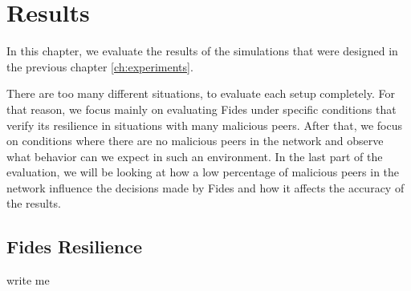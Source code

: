 \chapter{Results}
\label{ch:results}

In this chapter, we evaluate the results of the simulations that were designed in the previous chapter \ref{ch:experiments}.

There are too many different situations, to evaluate each setup completely.
For that reason, we focus mainly on evaluating Fides under specific conditions that verify its resilience in situations with many malicious peers.
After that, we focus on conditions where there are no malicious peers in the network and observe what behavior can we expect in such an environment.
In the last part of the evaluation, we will be looking at how a low percentage of malicious peers in the network influence the decisions made by Fides and how it affects the accuracy of the results.



\section{Fides Resilience}
\label{sec:fides-resilience}
write me